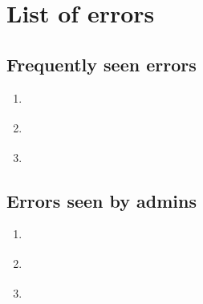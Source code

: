 \documentclass[letterpaper,10pt,english]{sphinxmanual}
\begin{document}
\section{List of errors}
\label{\detokenize{admin/troubleshoot:list-of-errors}}

\subsection{Frequently seen errors}
\label{\detokenize{admin/troubleshoot:frequently-seen-errors}}\begin{enumerate}
\item {} 
{\hyperref[\detokenize{admin/troubleshoot:init-creds-etype-nosupp}]{}}

\item {} 
{\hyperref[\detokenize{admin/troubleshoot:cert-chain-etype-nosupp}]{}}

\item {} 
{\hyperref[\detokenize{admin/troubleshoot:err-cert-chain-cert-expired}]{}}

\end{enumerate}


\subsection{Errors seen by admins}
\label{\detokenize{admin/troubleshoot:errors-seen-by-admins}}\label{\detokenize{admin/troubleshoot:prop-failed-start}}\begin{enumerate}
\item {} 
{\hyperref[\detokenize{admin/troubleshoot:kprop-no-route}]{}}

\item {} 
{\hyperref[\detokenize{admin/troubleshoot:kprop-con-refused}]{}}

\item {} 
{\hyperref[\detokenize{admin/troubleshoot:kprop-sendauth-exchange}]{}}

\end{enumerate}
\label{\detokenize{admin/troubleshoot:prop-failed-end}}
\end{document}
